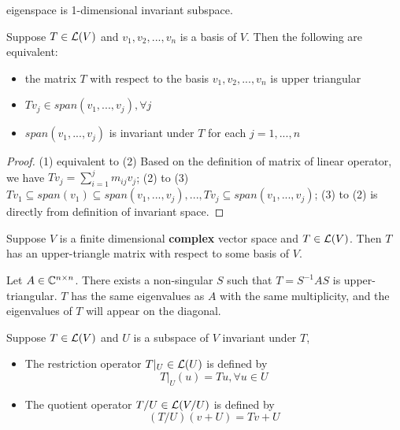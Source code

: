 \begin{refsection}
\begin{remark}
eigenspace is 1-dimensional invariant subspace.
\end{remark}


\begin{theorem}\cite[148]{axler2015linear}
Suppose $T\in \mathcal{L}(V)$ and $v_1,v_2,...,v_n$ is a basis of $V$. Then the following are equivalent:
\begin{itemize}
    \item the matrix $T$ with respect to the basis $v_1,v_2,...,v_n$ is upper triangular
    \item $Tv_j \in span(v_1,...,v_j),\forall j$
    \item $span(v_1,...,v_j)$ is invariant under $T$ for each $j=1,...,n$
\end{itemize}
\end{theorem}

\begin{proof}
(1) equivalent to (2) Based on the definition of matrix of linear operator, we have $Tv_j = \sum_{i=1}^j m_{ij}v_j$; (2) to (3) $Tv_1 \subseteq span(v_1) \subseteq span(v_1,...,v_j), ..., Tv_j \subseteq span(v_1,...,v_j)$; (3) to (2) is directly from definition of invariant space. 
\end{proof}



\begin{theorem}\label{ch:linearalgebra:th:existenceofupertrianglematrix}
\cite[149]{axler2015linear} Suppose $V$ is a finite dimensional \textbf{complex} vector space and $T\in \mathcal{L}(V)$. Then $T$ has an upper-triangle matrix with respect to some basis of $V$. 
\end{theorem}



\begin{theorem}
Let $A\in \mathbb{C}^{n\times n}$. There exists a non-singular $S$ such that $T = S^{-1}AS$ is upper-triangular. $T$ has the same eigenvalues as $A$ with the same multiplicity, and the eigenvalues of $T$ will appear on the diagonal.
\end{theorem}







\begin{definition}
\cite[137]{axler2015linear} Suppose $T\in \mathcal{L}(V)$ and $U$ is a subspace of $V$ invariant under $T$, \begin{itemize}
    \item The restriction operator $T|_U \in \mathcal{L}(U)$ is defined by 
    $$T|_U(u) = Tu,\forall u \in U$$
    \item The quotient operator $T/U \in \mathcal{L}(V/U)$ is defined by
    $$(T/U)(v+U) = Tv + U$$
\end{itemize}
\end{definition}


\end{refsection}
